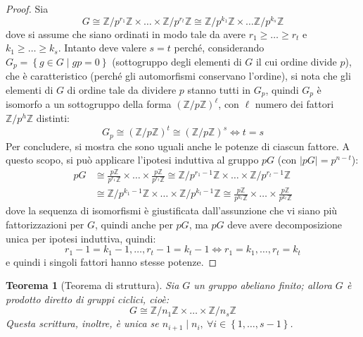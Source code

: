 \documentclass[12pt]{scrartcl}
\theoremstyle{style}
\newtheorem{teorema}{Teorema}[section]
\numberwithin{equation}{subsection}
\begin{document}
\begin{proof}
Sia 
\[
G \cong \mathbb{Z}/ p^{r_1} \mathbb{Z} \times \ldots \times \mathbb{Z}/ p^{r_t} \mathbb{Z} \cong \mathbb{Z}/ p^{k_1} \mathbb{Z}\times \ldots\mathbb{Z}/p^{k_s} \mathbb{Z}
\] 
dove si assume che siano ordinati in modo tale da avere $r_1\ge \ldots\ge r_t $ e $k_1\ge \ldots\ge k_s$.
Intanto deve valere $s=t$ perch\'e, considerando $G_p = \left\{ g \in G  \mid gp = 0 \right\} $ (sottogruppo degli elementi di $G$ il cui ordine divide $p$), che \`e caratteristico (perch\'e gli automorfismi conservano l'ordine), si nota che gli elementi di $G$ di ordine tale da dividere $p$ stanno tutti in $G_p$, quindi $G_p$ \`e isomorfo a un sottogruppo della forma $(\mathbb{Z} / p\mathbb{Z})^\ell $, con $\ell $ numero dei fattori $\mathbb{Z} / p^h \mathbb{Z}$ distinti:
\[
G_p \cong (\mathbb{Z}/p\mathbb{Z})^t \cong (\mathbb{Z}/p\mathbb{Z})^s \iff t= s
\] 
Per concludere, si mostra che sono uguali anche le potenze di ciascun fattore.
A questo scopo, si pu\`o applicare l'ipotesi induttiva al gruppo $pG$ (con $\lvert pG \rvert =p^{n-t} $):
\[
	\begin{split}
		pG &\cong \frac{p\mathbb{Z}}{p^{r_1} \mathbb{Z}} \times \ldots\times \frac{p\mathbb{Z}}{p^{r_t} \mathbb{Z}}\cong \mathbb{Z}/p^{r_1-1} \mathbb{Z} \times  \ldots \times \mathbb{Z}/p^{r_t - 1} \mathbb{Z}\\
		   &\cong \mathbb{Z}/p^{k_1-1} \mathbb{Z}\times \ldots\times \mathbb{Z}/p^{k_t-1} \mathbb{Z}\cong \frac{p\mathbb{Z}}{p^{k_1} \mathbb{Z}}\times \ldots \times \frac{p\mathbb{Z}}{p^{k_t} \mathbb{Z}}
	\end{split}
\] 
dove la sequenza di isomorfismi \`e giustificata dall'assunzione che vi siano pi\`u fattorizzazioni per $G$, quindi anche per $pG$, ma $pG$ deve avere decomposizione unica per ipotesi induttiva, quindi:
\[
r_1-1=k_1-1, \ldots, r_t - 1 = k_t - 1 \iff r_1=k_1,\ldots,r_t = k_t
\] 
e quindi i singoli fattori hanno stesse potenze.
	\end{proof}
\begin{teorema}
	[Teorema di struttura]
	Sia $G$ un gruppo abeliano finito; allora $G$ \`e prodotto diretto di gruppi ciclici, cio\`e:
	\[
	G \cong \mathbb{Z}/n_1\mathbb{Z} \times  \ldots \times \mathbb{Z} / n_s \mathbb{Z}
	\] 
	Questa scrittura, inoltre, \`e unica se $n_{i+1}  \mid n_i, \ \forall i \in \left\{ 1, \ldots, s-1 \right\} $.
\end{teorema}
\end{document}

